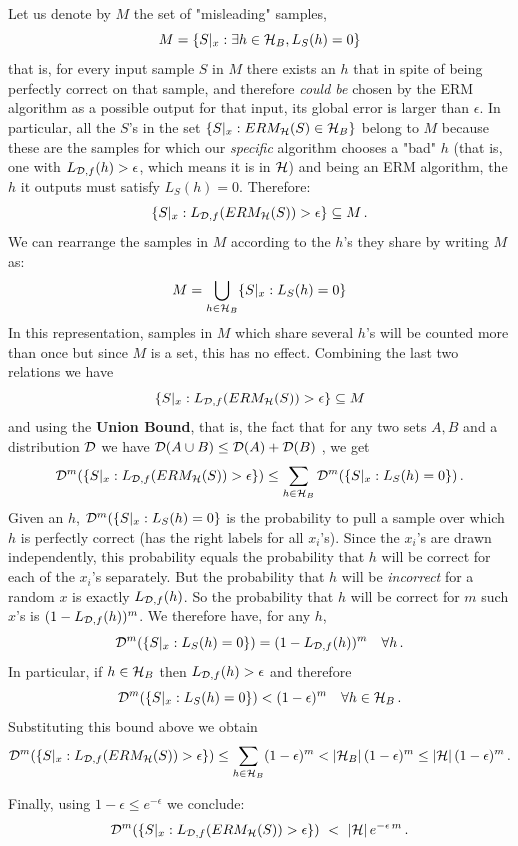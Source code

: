 Let us denote by $M$ the set of "misleading" samples,
\[M = \{S|_x : \exists h \in \mathcal{H}_B, L_S(h)=0\} \]
%
that is, for every input sample $S$ in $M$ there exists an $h$ that in spite of being perfectly correct on that sample, and therefore \textit{could be} chosen by the ERM algorithm as a possible output for that input, its global error is larger than $\epsilon$. In particular, all the $S$'s in the set $\{ S|_x : ERM_{\mathcal{H}}(S)\in \mathcal{H}_B \}$ belong to $M$ because these are the samples for which our \textit{specific} algorithm chooses a "bad" $h$ (that is, one with $L_{\mathcal{D},f}(h) > \epsilon$, which means it is in $\mathcal{H}$) and being an ERM algorithm, the $h$ it outputs must satisfy $L_S(h)=0$. Therefore:
%
\[\{S|_x : L_{\mathcal{D},f}(ERM_{\mathcal{H}}(S)) > \epsilon\} \subseteq M \,.\]
We can rearrange the samples in  $M$ according to the $h$'s they share by writing $M$ as:
\[ M = \bigcup_{h \in \mathcal{H}_B} \{ S|_x : L_S(h) = 0 \}\]
In this representation, samples in $M$ which share several $h$'s will be counted more than once but since $M$ is a set, this has no effect.
Combining the last two relations we have
\[\{S|_x : L_{\mathcal{D},f}(ERM_{\mathcal{H}}(S)) > \epsilon\} \subseteq M \]
and using the \textbf{Union Bound}, that is, the fact that for any two sets $A,B$ and a distribution $\mathcal{D}$ we have $\mathcal{D}(A \cup B) \le \mathcal{D}(A) + \mathcal{D}(B) ~$, we get
$$\mathcal{D}^m(\{ S|_x : L_{\mathcal{D},f}(ERM_{\mathcal{H}}(S)) > \epsilon \}) \le \sum_{h \in \mathcal{H}_B} \mathcal{D}^m( \{ S|_x : L_S(h) = 0 \} )\,.$$
Given an $h$, $ \mathcal{D}^m( \{ S|_x : L_S(h) = 0 \}$ is the probability to pull a sample over which $h$ is perfectly correct (has the right labels for all $x_i$'s). 
Since the  $x_i$'s are drawn independently, this probability equals the probability that $h$ will be correct for each of the $x_i$'s separately. 
But the probability that $h$ will be \textit{incorrect} for a random $x$ is exactly $L_{\mathcal{D},f}(h)$. So the probability that $h$ will be correct for $m$ such $x$'s is $(1-L_{\mathcal{D},f}(h))^m$. 
We therefore have, for any $h$,
\[ \mathcal{D}^m( \{ S|_x : L_S(h) = 0 \} ) = (1-L_{\mathcal{D},f}(h))^m \quad \forall h \,.\]
In particular, if $h \in \mathcal{H}_B$ then $L_{\mathcal{D},f}(h) > \epsilon$ and therefore
\[ \mathcal{D}^m( \{ S|_x : L_S(h) = 0 \} ) < (1-\epsilon)^m \quad \forall h \in \mathcal{H}_B \,.\]
Substituting this bound above we obtain
\[ \mathcal{D}^m(\{ S|_x : L_{\mathcal{D},f}(ERM_{\mathcal{H}}(S)) > \epsilon \}) \le \sum_{h \in \mathcal{H}_B} (1-\epsilon)^m < |\mathcal{H}_B|\,(1-\epsilon)^m  \le  |\mathcal{H}|\,(1-\epsilon)^m \,.\]

Finally, using $1-\epsilon \le e^{-\epsilon}$ we conclude:
\[ \mathcal{D}^m(\{ S|_x : L_{\mathcal{D},f}(ERM_{\mathcal{H}}(S)) > \epsilon \}) ~<~ |\mathcal{H}|\,e^{-\epsilon\,m} \,.\]

